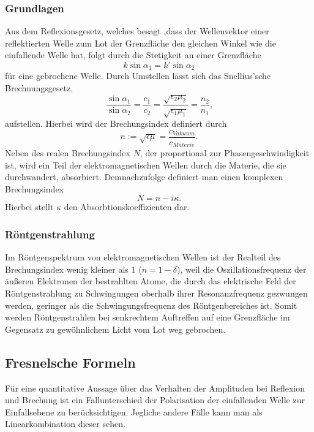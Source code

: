 \subsubsection*{Grundlagen}
Aus dem Reflexionsgesetz, welches besagt ,dass der Wellenvektor einer reflektierten Welle zum Lot der Grenzfläche den gleichen Winkel wie die einfallende Welle hat,
folgt durch die Stetigkeit an einer Grenzfläche
\begin{equation}
    k \sin \alpha_1 = k' \sin \alpha_2
    \label{eq:Stetigkeit}
\end{equation}
für eine gebrochene Welle.
Durch Umstellen lässt sich das Snellius'sche Brechnungsgesetz,
\begin{equation}
    \frac{\sin \alpha_1}{\sin \alpha_2} = \frac{c_1}{c_2} = \frac{\sqrt{\epsilon_2\mu_2}}{\sqrt{\epsilon_1\mu_1}} = \frac{n_2}{n_1} \text{,}
    \label{eq:Snellius}
\end{equation}
aufstellen. Hierbei wird der Brechungsindex definiert durch
\begin{equation}
    n := \sqrt{\epsilon\mu} = \frac{c_{Vakuum}}{c_{Materie}}.
\end{equation}
Neben des realen Brechungsindex $N$, der proportional zur Phasengeschwindigkeit ist,
wird ein Teil der elektromagnetischen Wellen durch die Materie, die sie durchwandert, absorbiert.
Demnachzufolge definiert man einen komplexen Brechungsindex
\begin{equation}
    N = n - i\kappa \text{.}
    \label{eq:nKomplex}
\end{equation}
Hierbei stellt $\kappa$ den Absorbtionskoeffizienten dar.

\subsubsection*{Röntgenstrahlung}
Im Röntgenspektrum von elektromagnetischen Wellen ist der Realteil des Brechungsindex wenig kleiner als 1 ($n = 1 - \delta$),
weil die Oszillationsfrequenz der äußeren Elektronen der bestrahlten Atome, die durch das elektrische Feld der Röntgenstrahlung zu Schwingungen oberhalb
ihrer Resonanzfrequenz gezwungen werden, geringer als die Schwingungsfrequenz des Röntgenbereiches ist.
Somit werden Röntgenstrahlen bei senkrechtem Auftreffen auf eine Grenzfläche im Gegensatz zu gewöhnlichem Licht vom Lot weg gebrochen.

\subsection{Fresnelsche Formeln}
Für eine quantitative Aussage über das Verhalten der Amplituden bei Reflexion und Brechung ist ein Fallunterschied der Polarisation der einfallenden Welle zur Einfallsebene zu berücksichtigen.
Jegliche andere Fälle kann man als Linearkombination dieser sehen.\cite{physik}
